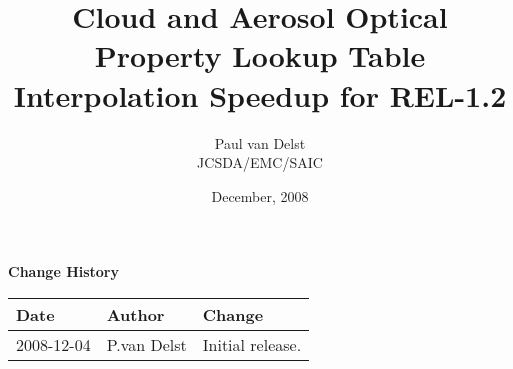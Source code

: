 


\title{Cloud and Aerosol Optical Property Lookup Table Interpolation Speedup for REL-1.2}
\author{Paul van Delst\\JCSDA/EMC/SAIC}
\date{December, 2008}



\maketitle


\thispagestyle{empty}
\vspace*{10cm}
\begin{center}
  {\sffamily\Large\bfseries Change History}
  \begin{table}[htp]
    \centering
    \begin{tabular}{|p{2cm}|p{3cm}|p{8cm}|}
      \hline
      \sffamily\textbf{Date} & \sffamily\textbf{Author} & \sffamily\textbf{Change}\\
      \hline\hline
      2008-12-04 & P.van Delst & Initial release.\\
      \hline
    \end{tabular}
  \end{table}
\end{center}
\clearpage
{}
\setcounter{page}{1}







%
%





